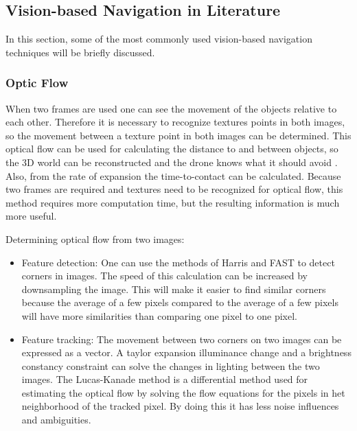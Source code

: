 \subsection{Vision-based Navigation in Literature}
\label{subsec:lit_vision}
In this section, some of the most commonly used vision-based navigation techniques will be briefly discussed.
\subsubsection{Optic Flow}


When two frames are used one can see the movement of the objects relative to each other. Therefore it is necessary to recognize textures points in both images, so the movement between a texture point in both images can be determined. This optical flow can be used for calculating the distance to and between objects, so the 3D world can be reconstructed and the drone knows what it should avoid \cite{Gibson}. Also, from the rate of expansion the time-to-contact can be calculated. Because two frames are required and textures need to be recognized for optical flow, this method requires more computation time, but the resulting information is much more useful.

Determining optical flow from two images:
\begin{itemize}
\item Feature detection: One can use the methods of Harris and FAST to detect corners in images. The speed of this calculation can be increased by downsampling the image. This will make it easier to find similar corners  because the average of a few pixels compared to the average of a few pixels will have more similarities than comparing one pixel to one pixel.
\item Feature tracking: The movement between two corners on two images can be expressed as a vector. A taylor expansion illuminance change and a brightness constancy constraint   can solve the changes in lighting between the two images. The Lucas-Kanade method is a differential method used for estimating the optical flow by solving the flow equations for the pixels in het neighborhood of the tracked pixel. By doing this it has less noise influences and ambiguities.
\end{itemize}

